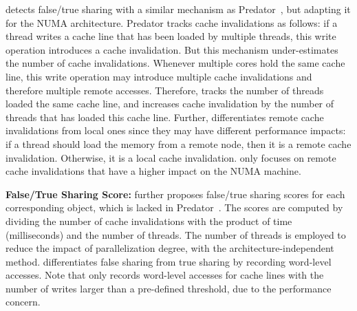 \NP{} detects false/true sharing with a similar mechanism as Predator~\cite{Predator}, but adapting it for the NUMA architecture. Predator tracks cache invalidations as follows: if a thread writes a cache line that has been loaded by multiple threads, this write operation introduces a cache invalidation. But this mechanism under-estimates the number of cache invalidations. Whenever multiple cores hold the same cache line, this  write operation may introduce multiple  cache invalidations and therefore multiple remote accesses. 
Therefore, \NP{} tracks the number of threads  loaded the same cache line, and increases cache invalidation by the number of threads that has loaded this cache line. Further, \NP{} differentiates remote cache invalidations from local ones since they may have different performance impacts: if a thread should load the memory from a remote node, then it is a remote cache invalidation. Otherwise, it is a local cache invalidation. \NP{} only focuses on remote cache invalidations that have a higher impact on the NUMA machine.  

\textbf{False/True Sharing Score:} 
\NP{} further proposes false/true sharing scores for each corresponding object, which is lacked in Predator~\cite{Predator}. The scores are computed by dividing the number of cache invalidations with the product of time (milliseconds) and the number of threads. The number of threads is employed to reduce the impact of parallelization degree, with the architecture-independent method.  
\NP{}  differentiates false sharing from true sharing by recording word-level accesses. 
Note that \NP{} only records word-level accesses for cache lines with the number of writes larger than a pre-defined threshold, due to the performance concern. 




